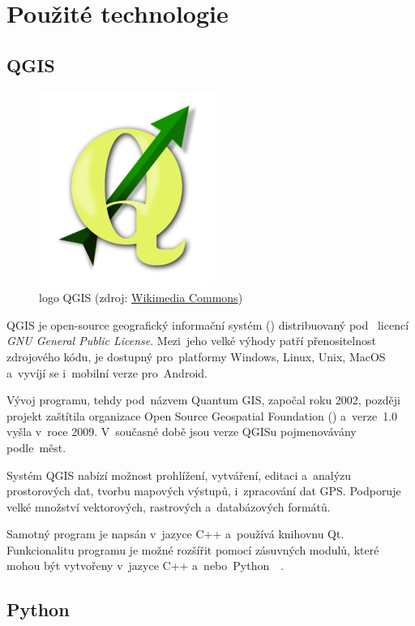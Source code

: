 \chapter{Použité technologie}
\label{technologie}

\section{QGIS}
\label{qgis}

	\begin{figure}[H]
		\centering
		\includegraphics[width=.3\textwidth]{./pictures/qgis_logo.png}
      	\caption[logo QGIS]{logo QGIS (zdroj: \href{https://commons.wikimedia.org/wiki/File:QGis_Logo.png}{Wikimedia Commons})}
		\label{fig:qgis_logo}
 	\end{figure}

QGIS je open-source geografický informační systém () distribuovaný pod ~licencí \textit{GNU General Public License}. Mezi~jeho velké výhody patří přenositelnost zdrojového kódu, je dostupný pro~platformy Windows, Linux, Unix, MacOS a~vyvíjí se i~mobilní verze pro~Android.

Vývoj programu, tehdy pod~názvem Quantum GIS, započal roku 2002, později projekt zaštítila organizace Open Source Geospatial Foundation () a~verze~1.0 vyšla v~roce 2009. V~současné době jsou verze QGISu pojmenovávány podle~měst.

Systém QGIS nabízí možnost prohlížení, vytváření, editaci a~analýzu prostorových dat, tvorbu mapových výstupů, i~zpracování dat GPS. Podporuje velké množství vektorových, rastrových a~databázových formátů.

Samotný program je napsán v~jazyce C++ a~používá knihovnu Qt. Funkcionalitu programu je možné rozšířit pomocí zásuvných modulů, které mohou být vytvořeny v~jazyce C++ a~nebo~Python~\citep{qgis}~\citep{wiki_qgis}.

\section{Python}
\label{python}

